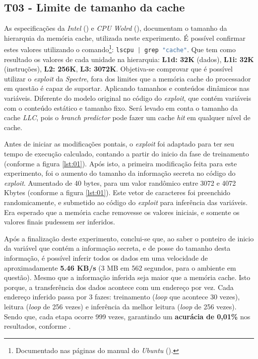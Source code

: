 \documentclass[
	article,			    %
	12pt,				    %
	oneside,			    %
	a4paper,			    %
	chapter=TITLE,		    %
	section=TITLE,		    %
	subsection=TITLE,	    %
	english,			    %
	brazil,				    %
	sumario=tradicional
]{abntex2}
\begin{document}
\begin{comment}
explicar mais sobre o que é "contexto" nesse sentindo
\end{comment}

\subsection{T03 - Limite de tamanho da cache}
As especificações da \emph{Intel} (\citeyear{Intel2019Corei3}) e \emph{CPU Wolrd} (\citeyear{CPU2016Corei3}), documentam o tamanho da hierarquia da memória cache, utilizada neste experimento. É possível confirmar estes valores utilizando o comando\footnote{Documentado nas páginas do manual do \emph{Ubuntu} (\citeyear{Ubuntu2019Lscpu}).}: \lstinline[language=C, style=c]{lscpu | grep "cache"}. Que tem como resultado os valores de cada unidade na hierarquia: \textbf{L1d: 32K} (dados), \textbf{L1i: 32K} (instruções), \textbf{L2: 256K}, \textbf{L3: 3072K}. Objetiva-se comprovar que é possível utilizar o \emph{exploit} da \emph{Spectre}, fora dos limites que a memória cache do processador em questão é capaz de suportar. Aplicando tamanhos e conteúdos dinâmicos nas variáveis. Diferente do modelo original no código do \emph{exploit}, que contém variáveis com o conteúdo estático e tamanho fixo. Será levado em conta o tamanho da cache \emph{LLC}, pois o \emph{branch predictor} pode fazer um cache \emph{hit} em qualquer nível de cache.



Antes de iniciar as modificações pontais, o \emph{exploit} foi adaptado para ter seu tempo de execução calculado, contando a partir do inicio da fase de treinamento (conforme a figura \ref{lst:01}). Após isto, a primeira modificação feita para este experimento, foi o aumento do tamanho da informação secreta no código do \emph{exploit}. Aumentado de 40 bytes, para um valor randômico entre 3072 e 4072 Kbytes (conforme a figura \ref{lst:01}). Este vetor de caracteres foi preenchido randomicamente, e submetido ao código do \emph{exploit} para inferência das variáveis. Era esperado que a memória cache removesse os valores iniciais, e somente os valores finais pudessem ser inferidos.

Após a finalização deste experimento, conclui-se que, ao saber o ponteiro de inicio da variável que contém a informação secreta, e de posse do tamanho desta informação, é possível inferir todos os dados em uma velocidade de aproximadamente \textbf{5.46 KB/s} (3 MB em 562 segundos, para o ambiente em questão). Mesmo que a informação inferida seja maior que a memória cache. Isto porque, a transferência dos dados acontece com um endereço por vez. Cada endereço inferido passa por 3 fazes: treinamento (\emph{loop} que acontece 30 vezes), leitura (\emph{loop} de 256 vezes) e inferência da melhor leitura (\emph{loop} de 256 vezes). Sendo que, cada etapa ocorre 999 vezes, garantindo um \textbf{acurácia de 0,01\%} nos resultados, conforme .
\end{document}
